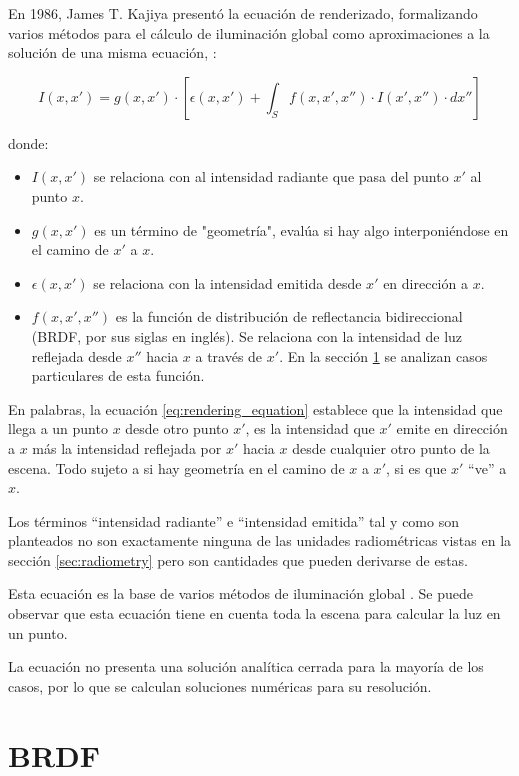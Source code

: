 En 1986, James T. Kajiya presentó la ecuación de renderizado, formalizando varios métodos para el cálculo de iluminación global como aproximaciones a la solución de una misma ecuación, \cite{rendering-equation}:

\begin{equation}\label{eq:rendering_equation}
    I(x, x') = g(x, x') \cdot \left[\epsilon(x, x') + \int_S f(x, x', x'') \cdot I(x', x'') \cdot dx'' \right]
\end{equation}

donde:
\begin{itemize}
    \item $I(x, x')$ se relaciona con al intensidad radiante que pasa del punto $x'$ al punto $x$.
    \item $g(x, x')$ es un término de "geometría", evalúa si hay algo interponiéndose en el camino de $x'$ a $x$.
    \item $\epsilon(x, x')$ se relaciona con la intensidad emitida desde $x'$ en dirección a $x$.
    \item $f(x, x', x'')$ es la función de distribución de reflectancia bidireccional (BRDF, por sus siglas en inglés). Se relaciona con la intensidad de luz reflejada desde $x''$ hacia $x$ a través de $x'$. En la sección \ref{sec:brdf} se analizan casos particulares de esta función.
\end{itemize}

En palabras, la ecuación \ref{eq:rendering_equation} establece que la intensidad que llega a un punto $x$ desde otro punto $x'$, es la intensidad que $x'$ emite en dirección a $x$ más la intensidad reflejada por $x'$ hacia $x$ desde cualquier otro punto de la escena.
Todo sujeto a si hay geometría en el camino de $x$ a $x'$, si es que $x'$ ``ve'' a $x$.

Los términos ``intensidad radiante'' e ``intensidad emitida'' tal y como son planteados no son exactamente ninguna de las unidades radiométricas vistas en la sección \ref{sec:radiometry} pero son cantidades que pueden derivarse de estas.

Esta ecuación es la base de varios métodos de iluminación global \cite{rtr}.
Se puede observar que esta ecuación tiene en cuenta toda la escena para calcular la luz en un punto.

La ecuación no presenta una solución analítica cerrada para la mayoría de los casos, por lo que se calculan soluciones numéricas para su resolución.

\section{BRDF}\label{sec:brdf}

